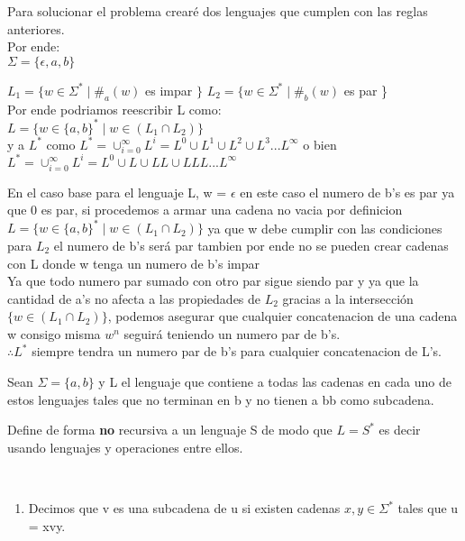 \begin{questions}
\begin{solution}
    Para solucionar el problema crear\'e dos lenguajes que cumplen
    con las reglas anteriores. \\
    Por ende: \\
    $\Sigma = \{\epsilon, a,b\}$

    $L_{1} = \{w \in \Sigma^{*}\mid \#_{a}(w)$ es impar $\}$
    $L_{2} = \{w \in \Sigma^{*}\mid \#_{b}(w)$ es par \} \\

    Por ende podriamos reescribir L como: \\
    $L = \{w \in \{a,b\}^{*} \mid w \in (L_{1} \cap L_{2})\}$
    \\

    y a $L^{*}$ como $L^{*} = \cup^{\infty}_{i=0} L^{i} = L^{0} \cup L^{1} \cup L^{2} \cup L^{3} ... L^{\infty}$ 
    o bien \\ $L^{*} = \cup^{\infty}_{i=0} L^{i} = L^{0} \cup L \cup LL \cup LLL ... L^{\infty}$

    En el caso base para el lenguaje L, w = $\epsilon$ en este caso el numero de b's es par ya que 0 es par, si procedemos a armar una cadena 
    no vacia por definicion $L = \{w \in \{a,b\}^{*} \mid w \in (L_{1} \cap L_{2})\}$ ya que w debe cumplir con las condiciones
    para $L_{2}$ el numero de b's ser\'a par tambien por ende no se pueden crear cadenas con L donde w tenga un numero de b's impar \\

    Ya que todo numero par sumado con otro par sigue siendo par y ya que la cantidad de a's no afecta a las propiedades de $L_{2}$
    gracias a la intersecci\'on $\{w \in (L_{1} \cap L_{2})\}$, podemos asegurar que cualquier concatenacion de una cadena w consigo misma $w^n$ seguir\'a teniendo 
    un numero par de b's. \\
    $\therefore L^{*}$  siempre tendra un numero par de b's para cualquier concatenacion de L's.

    
\end{solution} 

\question Sean $\Sigma = \{a,b\}$  y L el lenguaje que contiene a todas las cadenas en cada
uno de estos lenguajes tales que no terminan en b y no tienen a bb como subcadena.

Define de forma {\bf no} recursiva a un lenguaje S de modo que $L = S^{*}$ es decir usando lenguajes
y operaciones entre ellos.

\begin{solution}
    \\
    \begin{enumerate}
        \item Decimos que v es una subcadena de u si existen cadenas $x,y \in \Sigma^{*}$ tales que u = xvy.
    \end{enumerate}
\end{solution}


\end{questions}
